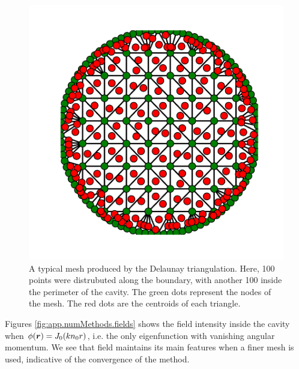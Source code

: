 \begin{figure}
	\centering
	\includegraphics{figs/backmatter/meshCircle-100.pdf}
	\caption[Typical Delaunay triangulation mesh]
			{A typical mesh produced by the Delaunay triangulation.
			Here, 100 points were distrubuted along the boundary,  
			with another 100 inside the perimeter of the cavity. The green
			dots represent the nodes of the mesh. The red dots are the centroids
			of each triangle.}
	\label{fig:app.numMethods.meshDelaunayCircle}
\end{figure}

Figures \ref{fig:app.numMethods.fields} shows the field intensity
inside the cavity when $\phi(\boldsymbol{r})=J_0(kn_0r)$, i.e. the only
eigenfunction with vanishing angular momentum. We see that field
maintains its main features when a finer mesh is used, indicative
of the convergence of the method. 


